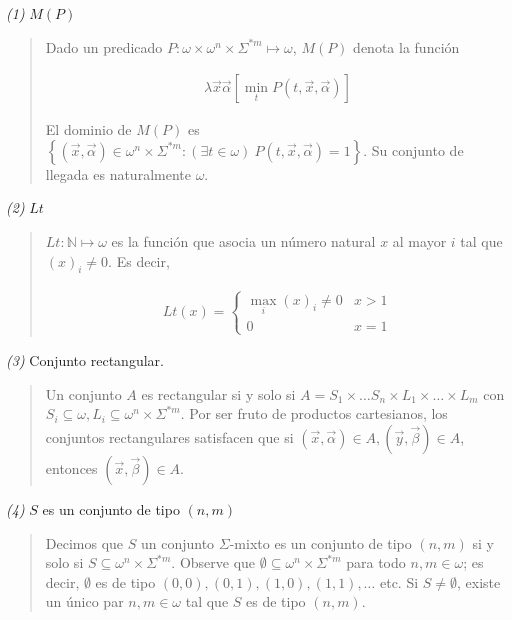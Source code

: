 \documentclass[a4paper, 12pt]{article}
\begin{document}
\pagebreak 

\textit{(1)} $M(P)$


\small
\begin{quote}

Dado un predicado $P : \omega \times  \omega^{n} \times \Sigma^{*m} \mapsto
\omega$, $M(P)$ denota la función 

\begin{align*}
    \lambda \vec{x}\vec{\alpha} \left[ \min_t P(t, \vec{x}, \vec{\alpha})  \right]
\end{align*}

El dominio de $M(P)$ es $\left\{ (\vec{x}, \vec{\alpha}) \in \omega^{n} \times
\Sigma^{*m} : (\exists t \in \omega) ~ P(t, \vec{x}, \vec{\alpha}) = 1 \right\}
$. Su conjunto de llegada es naturalmente $\omega$.

\end{quote}
\normalsize

\textit{(2)} $Lt$


\small
\begin{quote}

$Lt : \mathbb{N} \mapsto \omega$ es la función que asocia un número natural $x$
al mayor $i$ tal que $(x)_i \neq 0$. Es decir, 

\begin{align*}
    Lt(x) = \begin{cases}
        \max_i (x)_i \neq 0 & x > 1\\ 
        0 & x = 1
    \end{cases}
\end{align*}

\end{quote}
\normalsize

\textit{(3)} Conjunto rectangular.


\small
\begin{quote}

Un conjunto $A$  es rectangular si y solo si $A = S_1 \times \ldots S_n \times
L_1 \times \ldots \times L_m$ con $S_i \subseteq \omega, L_i \subseteq
\omega^{n} \times \Sigma^{*m} $. Por ser fruto de productos cartesianos, los
conjuntos rectangulares satisfacen que si $(\vec{x}, \vec{\alpha}) \in A,
(\vec{y}, \vec{\beta}) \in A$, entonces $(\vec{x}, \vec{\beta}) \in A$.

\end{quote}
\normalsize

\textit{(4)} $S$ es un conjunto de tipo $(n, m)$


\small
\begin{quote}

Decimos que $S$ un conjunto $\Sigma$-mixto es un conjunto de tipo $(n, m)$ si y
solo si $S \subseteq \omega^{n} \times \Sigma^{*m} $. Observe que $\emptyset
\subseteq \omega^{n} \times \Sigma^{*m} $ para todo $n, m \in \omega$; es decir,
$\emptyset$ es de tipo $(0, 0), (0, 1), (1, 0), (1, 1), \ldots$ etc. Si $S \neq
\emptyset$, existe un único par $n, m \in \omega$ tal que $S$ es de tipo $(n,
m)$.

\end{quote}
\normalsize
\end{document}

